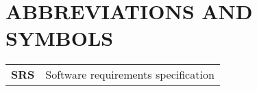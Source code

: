 \section*{ABBREVIATIONS AND SYMBOLS}

\begin{tabular}{l l}

\textbf{SRS} & Software requirements specification\\

\end{tabular}